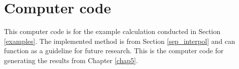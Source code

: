 \chapter{Computer code}
\label{app:code}
This computer code is for the example calculation conducted in Section \ref{examples}.
The implemented method is from Section \ref{sep_interpol} and can function as a guideline for future research.
This is the computer code for generating the results from Chapter \ref{chap5}.
